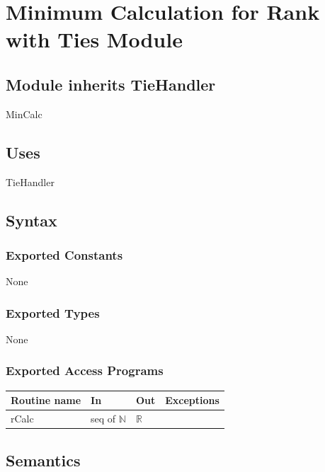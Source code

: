 \documentclass[12pt,fleqn]{examtst}
\begin{document}

\newpage

\section* {Minimum Calculation for Rank with Ties Module}

\subsection*{Module inherits TieHandler}

MinCalc

\subsection* {Uses}

TieHandler

\subsection* {Syntax}

\subsubsection* {Exported Constants}

None

\subsubsection* {Exported Types}

None 

\subsubsection* {Exported Access Programs}

\begin{tabular}{| l | l | l | p{5cm} |}
\hline
\textbf{Routine name} & \textbf{In} & \textbf{Out} & \textbf{Exceptions}\\
\hline
rCalc & seq of $\mathbb{N}$ & $\mathbb{R}$ & ~\\
\hline
\end{tabular}

\subsection* {Semantics}
\end{document}
